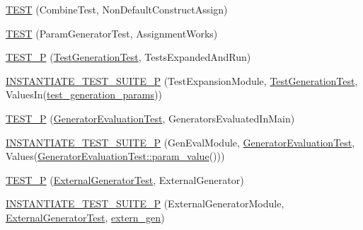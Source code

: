 \begin{DoxyCompactItemize}
\item 
\mbox{\hyperlink{_obj__test_2lib_2googletest-master_2googletest_2test_2googletest-param-test-test_8cc_a67908fbc85ddfdda8ce3e8a4282115f7}{T\+E\+ST}} (Combine\+Test, Non\+Default\+Construct\+Assign)
\item 
\mbox{\hyperlink{_obj__test_2lib_2googletest-master_2googletest_2test_2googletest-param-test-test_8cc_aca8e985a9ed651999aed02287e9e67ba}{T\+E\+ST}} (Param\+Generator\+Test, Assignment\+Works)
\item 
\mbox{\hyperlink{_obj__test_2lib_2googletest-master_2googletest_2test_2googletest-param-test-test_8cc_a6c5cf7b74d0cec5d5170659d1d31b560}{T\+E\+S\+T\+\_\+P}} (\mbox{\hyperlink{class_test_generation_test}{Test\+Generation\+Test}}, Tests\+Expanded\+And\+Run)
\item 
\mbox{\hyperlink{_obj__test_2lib_2googletest-master_2googletest_2test_2googletest-param-test-test_8cc_a9cc091d291c71bfd813289cc81f09789}{I\+N\+S\+T\+A\+N\+T\+I\+A\+T\+E\+\_\+\+T\+E\+S\+T\+\_\+\+S\+U\+I\+T\+E\+\_\+P}} (Test\+Expansion\+Module, \mbox{\hyperlink{class_test_generation_test}{Test\+Generation\+Test}}, Values\+In(\mbox{\hyperlink{_obj__test_2lib_2googletest-release-1_88_81_2googletest_2test_2googletest-param-test-test_8cc_aefe5c7eafc17e71cec010d92628bf84f}{test\+\_\+generation\+\_\+params}}))
\item 
\mbox{\hyperlink{_obj__test_2lib_2googletest-master_2googletest_2test_2googletest-param-test-test_8cc_afb359adcaa80d8d4de1a139e16ddbbcd}{T\+E\+S\+T\+\_\+P}} (\mbox{\hyperlink{class_generator_evaluation_test}{Generator\+Evaluation\+Test}}, Generators\+Evaluated\+In\+Main)
\item 
\mbox{\hyperlink{_obj__test_2lib_2googletest-master_2googletest_2test_2googletest-param-test-test_8cc_a272666f64d14841aa6bf7efd2eec2541}{I\+N\+S\+T\+A\+N\+T\+I\+A\+T\+E\+\_\+\+T\+E\+S\+T\+\_\+\+S\+U\+I\+T\+E\+\_\+P}} (Gen\+Eval\+Module, \mbox{\hyperlink{class_generator_evaluation_test}{Generator\+Evaluation\+Test}}, Values(\mbox{\hyperlink{class_generator_evaluation_test_ac819769e32b738677401424deb3c8cbe}{Generator\+Evaluation\+Test\+::param\+\_\+value}}()))
\item 
\mbox{\hyperlink{_obj__test_2lib_2googletest-master_2googletest_2test_2googletest-param-test-test_8cc_a83249caca89bdaafc2b8b167ffe9e684}{T\+E\+S\+T\+\_\+P}} (\mbox{\hyperlink{class_external_generator_test}{External\+Generator\+Test}}, External\+Generator)
\item 
\mbox{\hyperlink{_obj__test_2lib_2googletest-master_2googletest_2test_2googletest-param-test-test_8cc_ae0474a45b8b9ae1be2776ec9f015b41c}{I\+N\+S\+T\+A\+N\+T\+I\+A\+T\+E\+\_\+\+T\+E\+S\+T\+\_\+\+S\+U\+I\+T\+E\+\_\+P}} (External\+Generator\+Module, \mbox{\hyperlink{class_external_generator_test}{External\+Generator\+Test}}, \mbox{\hyperlink{_obj__test_2lib_2googletest-release-1_88_81_2googletest_2test_2googletest-param-test2-test_8cc_a0f691f1461778d71f30b1fb1dea1cb50}{extern\+\_\+gen}})

\end{DoxyCompactItemize}
